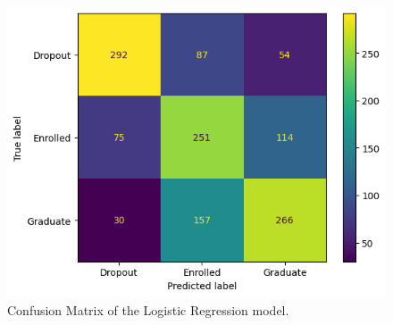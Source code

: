 \documentclass[11pt]{article}
\begin{document}
\begin{figure} [H]
  \centering
  \includegraphics[width=0.8\linewidth]{logist_confusion}
  \caption{Confusion Matrix of the Logistic Regression model.}\label{fig:logist_confusion}
\end{figure}  

\printbibliography[heading=bibintoc, title={References}]
\end{document}
